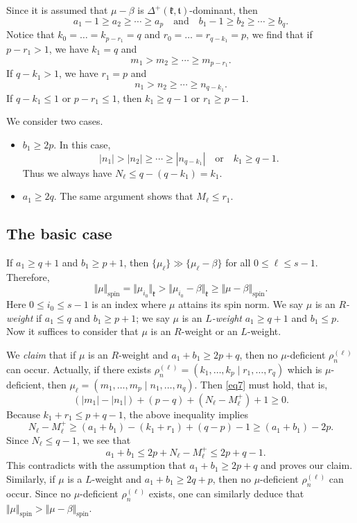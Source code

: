 \documentclass[11pt]{amsart}
\theoremstyle{plain}
\theoremstyle{definition}
\newcommand{\frk}{\mathfrak{k}}
\newcommand{\frt}{\mathfrak{t}}
\begin{document}
Since it is assumed that $\mu-\beta$ is $\Delta^+(\frk,\frt)$-dominant, then
\[a_1-1\ge a_2\ge\cdots\ge a_p\quad \mbox{and}\quad b_1-1\ge b_2\ge \cdots\ge b_q.\]
Notice that $k_0=\dots=k_{p-r_1}=q$ and $r_0=\dots=r_{q-k_1}=p$, we find that if $p-r_1>1$, we have $k_1=q$ and
\[m_1>m_2\ge\cdots\ge m_{p-r_1}.\]
If $q-k_1>1$, we have $r_1=p$ and
\[n_1>n_2\ge\cdots\ge n_{q-k_1}.\]
If $q-k_1\le 1$ or $p-r_1\le 1$, then $k_1\ge q-1$ or $r_1\ge p-1$.

 We consider two cases.
\begin{itemize}
	\item[$\bullet$] $b_1\ge 2p$. In this case,
	\begin{equation}\label{ineq1}
    |n_1|>|n_2|\ge\cdots\ge |n_{q-k_1}|\quad\mbox{or}\quad k_1\ge q-1.
    \end{equation}
	Thus we always have $N_\ell\le q-(q-k_1)=k_1$.
	\item[$\bullet$] $a_1\ge 2q$. The same argument shows that $M_\ell\le r_1$.
\end{itemize}

\subsection{The basic case}
If $a_1\ge q+1$ and $b_1\ge p+1$, then $\{\mu_\ell\}\gg\{\mu_\ell-\beta\}$ for all $0\leq \ell\leq s-1$. Therefore,
\[\Vert\mu\Vert_{\mathrm{spin}}=\Vert\mu_{i_0}\Vert_\frk>\Vert \mu_{i_0}-\beta\Vert_\frk\ge \Vert\mu-\beta\Vert_{\mathrm{spin}}.\]
Here $0\leq i_0\leq s-1$ is an index where $\mu$ attains its spin norm.
We say $\mu$ is an \emph{$R$-weight} if $a_1\le q$ and $b_1\ge p+1$; we say $\mu$ is an \emph{$L$-weight} $a_1\ge q+1$ and $b_1\le p$. Now it suffices to consider that $\mu$ is an $R$-weight or an $L$-weight.

We \emph{claim} that if $\mu$ is an $R$-weight and $a_1+b_1\ge 2p+q$,  then no $\mu$-deficient $\rho_n^{(\ell)}$ can occur. Actually, if there exists $\rho_n^{(\ell)}=(k_1,\dots,k_p\mid r_1,\dots,r_q)$ which is $\mu$-deficient, then $\mu_\ell=(m_1,\dots,m_p\mid n_1,\dots,n_q)$. Then \eqref{eq7} must hold, that is,
\[(|m_1|-|n_1|)+(p-q)+(N_\ell-M_\ell^+)+1\ge 0.\]
Because $k_1+r_1\le p+q-1$, the above  inequality implies
\[N_\ell-M_\ell^+\ge (a_1+b_1)-(k_1+r_1)+(q-p)-1\ge (a_1+b_1)-2p.\]
Since $N_\ell\le q-1$, we see that
\[ \quad a_1+b_1\le 2p+N_\ell-M_\ell^+ \le 2p+q-1.\]
This contradicts with the assumption that $a_1+b_1\ge 2p+q$ and proves our claim.
Similarly, if $\mu$ is a $L$-weight and $a_1+b_1\ge 2q+p$, then no $\mu$-deficient $\rho_n^{(\ell)}$ can occur. Since no $\mu$-deficient $\rho_n^{(\ell)}$ exists, one can similarly deduce that $\Vert\mu\Vert_{\mathrm{spin}}>\Vert \mu-\beta\Vert_{\mathrm{spin}}$.
\end{document}
